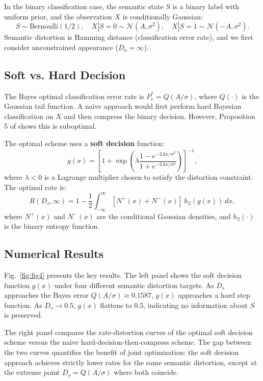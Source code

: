 \documentclass[conference]{IEEEtran}
\begin{document}
In the binary classification case, the semantic state $S$ is a binary label with uniform prior, and the observation $X$ is conditionally Gaussian:
\begin{equation}
S \sim \text{Bernoulli}(1/2), \quad
X|S=0 \sim \mathcal{N}(A, \sigma^2), \quad
X|S=1 \sim \mathcal{N}(-A, \sigma^2).
\end{equation}
Semantic distortion is Hamming distance (classification error rate), and we first consider unconstrained appearance ($D_a = \infty$).

\subsection{Soft vs. Hard Decision}

The Bayes optimal classification error rate is $P_e^* = Q(A/\sigma)$, where $Q(\cdot)$ is the Gaussian tail function. A naive approach would first perform hard Bayesian classification on $X$ and then compress the binary decision. However, Proposition 5 of \cite{liu2021rate} shows this is suboptimal.

The optimal scheme uses a \textbf{soft decision} function:
\begin{equation}
g(x) = \left[1 + \exp\left(\lambda \frac{1 - e^{-2Ax/\sigma^2}}{1 + e^{-2Ax/\sigma^2}}\right)\right]^{-1},
\end{equation}
where $\lambda < 0$ is a Lagrange multiplier chosen to satisfy the distortion constraint. The optimal rate is:
\begin{equation}
R(D_s, \infty) = 1 - \frac{1}{2}\int_{-\infty}^{\infty} [N^+(x) + N^-(x)]\, h_2(g(x))\, dx,
\end{equation}
where $N^+(x)$ and $N^-(x)$ are the conditional Gaussian densities, and $h_2(\cdot)$ is the binary entropy function.

\subsection{Numerical Results}

Fig.~\ref{fig:fig4} presents the key results. The left panel shows the soft decision function $g(x)$ under four different semantic distortion targets. As $D_s$ approaches the Bayes error $Q(A/\sigma) \approx 0.1587$, $g(x)$ approaches a hard step function. As $D_s \to 0.5$, $g(x)$ flattens to $0.5$, indicating no information about $S$ is preserved.

The right panel compares the rate-distortion curves of the optimal soft decision scheme versus the naive hard-decision-then-compress scheme. The gap between the two curves quantifies the benefit of joint optimization: the soft decision approach achieves strictly lower rates for the same semantic distortion, except at the extreme point $D_s = Q(A/\sigma)$ where both coincide.
\end{document}
